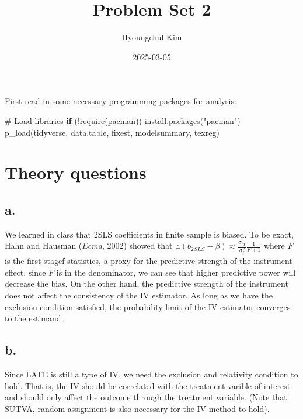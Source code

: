 \documentclass[
  letterpaper,
  DIV=11,
  numbers=noendperiod]{scrartcl}
\title{Problem Set 2}
\author{Hyoungchul Kim}
\date{2025-03-05}
\newenvironment{Shaded}{\begin{snugshade}}{\end{snugshade}}
\newcommand{\CommentTok}[1]{\textcolor[rgb]{0.37,0.37,0.37}{#1}}
\newcommand{\ControlFlowTok}[1]{\textcolor[rgb]{0.00,0.23,0.31}{\textbf{#1}}}
\newcommand{\FunctionTok}[1]{\textcolor[rgb]{0.28,0.35,0.67}{#1}}
\newcommand{\NormalTok}[1]{\textcolor[rgb]{0.00,0.23,0.31}{#1}}
\newcommand{\SpecialCharTok}[1]{\textcolor[rgb]{0.37,0.37,0.37}{#1}}
\newcommand{\StringTok}[1]{\textcolor[rgb]{0.13,0.47,0.30}{#1}}
\begin{document}
\maketitle


First read in some necessary programming packages for analysis:

\begin{Shaded}
\begin{Highlighting}[]
\CommentTok{\# Load libraries}
\ControlFlowTok{if}\NormalTok{ (}\SpecialCharTok{!}\FunctionTok{require}\NormalTok{(pacman)) }\FunctionTok{install.packages}\NormalTok{(}\StringTok{"pacman"}\NormalTok{)}
\FunctionTok{p\_load}\NormalTok{(tidyverse, data.table, fixest, modelsummary, texreg)}
\end{Highlighting}
\end{Shaded}

\section{Theory questions}\label{theory-questions}

\subsection{a.}\label{a.}

We learned in class that 2SLS coefficients in finite sample is biased.
To be exact, Hahn and Hausman (\emph{Ecma}, 2002) showed that
\(\mathbb{E}(b_{2SLS} - \beta) \approx \frac{\sigma_{\eta \xi}}{\sigma^2_\xi} \frac{1}{F+1}\)
where \(F\) is the first stagef-statistics, a proxy for the predictive
strength of the instrument effect. since \(F\) is in the denominator, we
can see that higher predictive power will decrease the bias. On the
other hand, the predictive strength of the instrument does not affect
the consistency of the IV estimator. As long as we have the exclusion
condition satisfied, the probability limit of the IV estimator converges
to the estimand.

\subsection{b.}\label{b.}

Since LATE is still a type of IV, we need the exclusion and relativity
condition to hold. That is, the IV should be correlated with the
treatment varible of interest and should only affect the outcome through
the treatment variable. (Note that SUTVA, random assignment is also
necessary for the IV method to hold).
\end{document}
